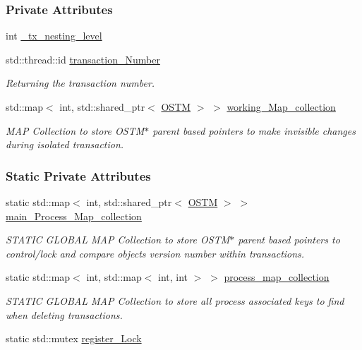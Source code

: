 \subsubsection*{Private Attributes}
\begin{DoxyCompactItemize}
\item 
int \hyperlink{class_t_x_ae8f413fd7f4fea322e7ad3c668f9898e_ae8f413fd7f4fea322e7ad3c668f9898e}{\+\_\+tx\+\_\+nesting\+\_\+level}
\item 
std\+::thread\+::id \hyperlink{class_t_x_a145a1c74b521f277fe481971a930b249_a145a1c74b521f277fe481971a930b249}{transaction\+\_\+\+Number}
\begin{DoxyCompactList}\small\item\em Returning the transaction number. \end{DoxyCompactList}\item 
std\+::map$<$ int, std\+::shared\+\_\+ptr$<$ \hyperlink{class_o_s_t_m}{O\+S\+TM} $>$ $>$ \hyperlink{class_t_x_a81aafda16e2f20e36ec6c68e584668ff_a81aafda16e2f20e36ec6c68e584668ff}{working\+\_\+\+Map\+\_\+collection}
\begin{DoxyCompactList}\small\item\em M\+AP Collection to store O\+S\+T\+M$\ast$ parent based pointers to make invisible changes during isolated transaction. \end{DoxyCompactList}\end{DoxyCompactItemize}
\subsubsection*{Static Private Attributes}
\begin{DoxyCompactItemize}
\item 
static std\+::map$<$ int, std\+::shared\+\_\+ptr$<$ \hyperlink{class_o_s_t_m}{O\+S\+TM} $>$ $>$ \hyperlink{class_t_x_a1a45d726894190695314464d7cd97c29_a1a45d726894190695314464d7cd97c29}{main\+\_\+\+Process\+\_\+\+Map\+\_\+collection}
\begin{DoxyCompactList}\small\item\em S\+T\+A\+T\+IC G\+L\+O\+B\+AL M\+AP Collection to store O\+S\+T\+M$\ast$ parent based pointers to control/lock and compare objects version number within transactions. \end{DoxyCompactList}\item 
static std\+::map$<$ int, std\+::map$<$ int, int $>$ $>$ \hyperlink{class_t_x_aea5b8eedcd5059384155576b3979a5f6_aea5b8eedcd5059384155576b3979a5f6}{process\+\_\+map\+\_\+collection}
\begin{DoxyCompactList}\small\item\em S\+T\+A\+T\+IC G\+L\+O\+B\+AL M\+AP Collection to store all process associated keys to find when deleting transactions. \end{DoxyCompactList}\item 
static std\+::mutex \hyperlink{class_t_x_aa688a8c96fa3cdf8cd92e267463536dc_aa688a8c96fa3cdf8cd92e267463536dc}{register\+\_\+\+Lock}
\end{DoxyCompactItemize}
